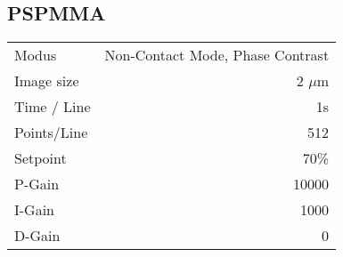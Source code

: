 \subsection{PSPMMA}

\begin{center}
    \centering
    \begin{tabular}{l|r}
        Modus & Non-Contact Mode, Phase Contrast\\
        Image size & 2 $\mu$m \\
        Time / Line & 1s \\
        Points/Line & 512\\
        Setpoint & 70\% \\
        P-Gain & 10000 \\
        I-Gain & 1000 \\
        D-Gain & 0 \\
        
    \end{tabular}
\end{center}







%
%
